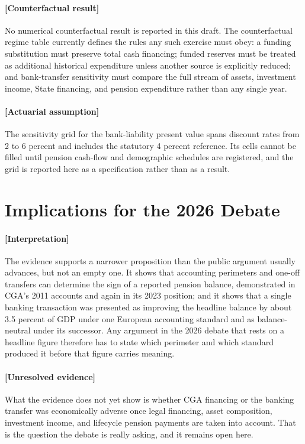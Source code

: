 \documentclass[11pt]{article}
\begin{document}
\paragraph{[Counterfactual result]}
No numerical counterfactual result is reported in this draft. The counterfactual regime table currently defines the rules any such exercise must obey: a funding substitution must preserve total cash financing; funded reserves must be treated as additional historical expenditure unless another source is explicitly reduced; and bank-transfer sensitivity must compare the full stream of assets, investment income, State financing, and pension expenditure rather than any single year.

\paragraph{[Actuarial assumption]}
The sensitivity grid for the bank-liability present value spans discount rates from 2 to 6 percent and includes the statutory 4 percent reference. Its cells cannot be filled until pension cash-flow and demographic schedules are registered, and the grid is reported here as a specification rather than as a result.

\section{Implications for the 2026 Debate}
\label{sec:implications}
\paragraph{[Interpretation]}
The evidence supports a narrower proposition than the public argument usually advances, but not an empty one. It shows that accounting perimeters and one-off transfers can determine the sign of a reported pension balance, demonstrated in CGA's 2011 accounts and again in its 2023 position; and it shows that a single banking transaction was presented as improving the headline balance by about 3.5 percent of GDP under one European accounting standard and as balance-neutral under its successor. Any argument in the 2026 debate that rests on a headline figure therefore has to state which perimeter and which standard produced it before that figure carries meaning.

\paragraph{[Unresolved evidence]}
What the evidence does not yet show is whether CGA financing or the banking transfer was economically adverse once legal financing, asset composition, investment income, and lifecycle pension payments are taken into account. That is the question the debate is really asking, and it remains open here.
\end{document}
